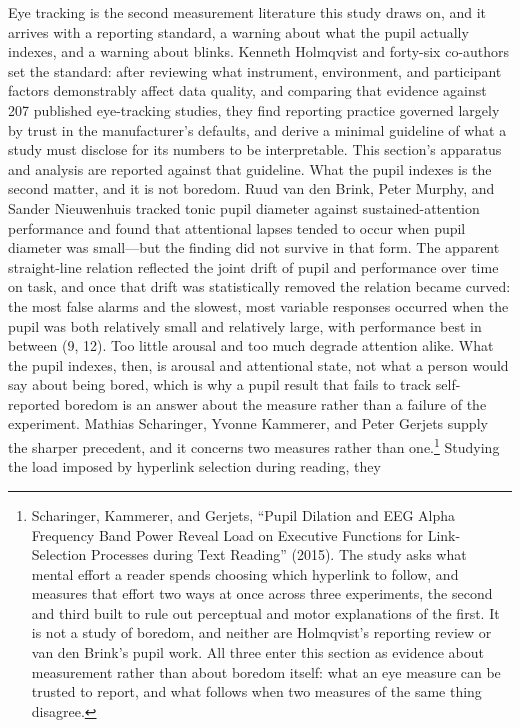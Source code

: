 Eye tracking is the second measurement literature this study draws on, and it arrives with a
reporting standard, a warning about what the pupil actually indexes, and a warning about
blinks. Kenneth Holmqvist and forty-six co-authors set the standard: after reviewing what
instrument, environment, and participant factors demonstrably affect data quality, and
comparing that evidence against 207 published eye-tracking studies, they find reporting
practice governed largely by trust in the manufacturer's defaults, and derive a minimal
guideline of what a study must disclose for its numbers to be interpretable. This section's
apparatus and analysis are reported against that guideline. What the pupil indexes is the
second matter, and it is not boredom. Ruud van den Brink, Peter Murphy, and Sander Nieuwenhuis
tracked tonic pupil diameter against sustained-attention performance and found that attentional
lapses tended to occur when pupil diameter was small---but the finding did not survive in that
form. The apparent straight-line relation reflected the joint drift of pupil and performance
over time on task, and once that drift was statistically removed the relation became curved:
the most false alarms and the slowest, most variable responses occurred when the pupil was
both relatively small and relatively large, with performance best in between (9, 12). Too
little arousal and too much degrade attention alike. What the pupil indexes, then, is arousal
and attentional state, not what a person would say about being bored, which is why a pupil
result that fails to track self-reported boredom is an answer about the measure rather than a
failure of the experiment.
Mathias Scharinger, Yvonne Kammerer, and Peter Gerjets supply the sharper precedent, and it
concerns two measures rather than one.\footnote{Scharinger, Kammerer, and Gerjets, ``Pupil
Dilation and EEG Alpha Frequency Band Power Reveal Load on Executive Functions for
Link-Selection Processes during Text Reading'' (2015). The study asks what mental effort a
reader spends choosing which hyperlink to follow, and measures that effort two ways at once
across three experiments, the second and third built to rule out perceptual and motor
explanations of the first. It is not a study of boredom, and neither are Holmqvist's reporting
review or van den Brink's pupil work. All three enter this section as evidence about
measurement rather than about boredom itself: what an eye measure can be trusted to report,
and what follows when two measures of the same thing disagree.} Studying the load imposed by hyperlink selection during reading, they
